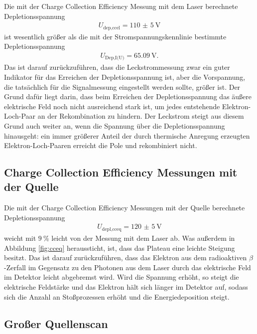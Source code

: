 Die mit der Charge Collection Efficiency Messung mit dem Laser berechnete Depletionsspannung
\begin{align}
  U_\text{dep,ccel} = \SI{110(5)}{\volt}
\end{align}
ist wesentlich größer als die mit der Stromspannungskennlinie bestimmte Depletionsspannung
\begin{align}
  U_\text{Dep,I(U)} = \SI{65.09}{\volt}.
\end{align}
Das ist darauf zurückzuführen, dass die Leckstrommessung zwar ein guter Indikator für das Erreichen der
Depletionsspannung ist, aber die Vorspannung, die tatsächlich für die Signalmessung eingestellt werden sollte,
größer ist. Der Grund dafür liegt darin, dass beim Erreichen der Depletionsspannung das äußere elektrische Feld noch nicht
ausreichend stark ist, um jedes entstehende Elektron-Loch-Paar an der Rekombination zu hindern. Der Leckstrom steigt aus diesem
Grund auch weiter an, wenn die Spannung über die Depletionsspannung hinausgeht: ein immer größerer Anteil der durch
thermische Anregung erzeugten Elektron-Loch-Paaren erreicht die Pole und rekombiniert nicht.

\subsection{Charge Collection Efficiency Messungen mit der Quelle}

Die mit der Charge Collection Efficiency Messungen mit der Quelle berechnete Depletionsspannung
\begin{align}
  U_\text{depl,cceq} = \SI{120(5)}{\volt}
\end{align}
weicht mit $\SI{9}{\percent}$ leicht von der Messung mit dem Laser ab. Was außerdem in Abbildung
\ref{fig:cceq} heraussticht, ist, dass das Plateau eine leichte Steigung besitzt. Das ist darauf zurückzuführen, dass
das Elektron aus dem radioaktiven $\beta$-Zerfall im Gegensatz zu den Photonen aus dem Laser durch das
elektrische Feld im Detektor leicht abgebremst wird. Wird die Spannung erhöht, so steigt die elektrische Feldstärke
und das Elektron hält sich länger im Detektor auf, sodass sich die Anzahl an Stoßprozessen erhöht und die Energiedeposition steigt.

\subsection{Großer Quellenscan}
